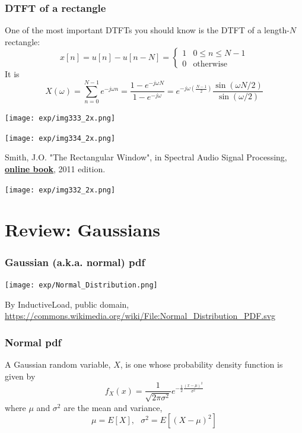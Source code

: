\documentclass{beamer}
\begin{document}
\begin{frame}
  \frametitle{DTFT of a rectangle}

  One of the most important DTFTs you should know is the DTFT of a
  length-$N$ rectangle:
  \[
  x[n] = u[n]-u[n-N]=\begin{cases}
  1 & 0\le n \le N-1\\
  0 & \mbox{otherwise}
  \end{cases}
  \]
  It is
  \[
  X(\omega)  = \sum_{n=0}^{N-1} e^{-j\omega n} =\frac{1-e^{-j\omega N}}{1-e^{-j\omega}}
  = e^{-j\omega\left(\frac{N-1}{2}\right)}\frac{\sin(\omega N/2)}{\sin(\omega/2)}
  \]
\end{frame}

\begin{frame}
  \centerline{\texttt{[image: exp/img333\_2x.png]}}
  \centerline{\texttt{[image: exp/img334\_2x.png]}}
  \begin{tiny}
    Smith, J.O. "The Rectangular Window", in 
    Spectral Audio Signal Processing,
    \href{http://ccrma.stanford.edu/~jos/sasp/Rectangular_Window.html}{\bf\color{blue}online book},
    2011 edition.
  \end{tiny}
\end{frame}

\begin{frame}
  \centerline{\texttt{[image: exp/img332\_2x.png]}}
\end{frame}


\section[Gaussians]{Review: Gaussians}
\setcounter{subsection}{1}

\begin{frame}
  \frametitle{Gaussian (a.k.a. normal) pdf}
  \centerline{\texttt{[image: exp/Normal\_Distribution.png]}}
  \begin{tiny}
    By InductiveLoad, public domain,
    \url{https://commons.wikimedia.org/wiki/File:Normal_Distribution_PDF.svg}
  \end{tiny}
\end{frame}

\begin{frame}
  \frametitle{Normal pdf}

  A Gaussian random variable, $X$, is one whose probability density
  function is given by
  \[
  f_X(x) = \frac{1}{\sqrt{2\pi\sigma^2}}e^{-\frac{1}{2}\frac{(x-\mu)^2}{\sigma^2}}
  \]
  where $\mu$ and $\sigma^2$ are the mean and variance,
  \[
  \mu=E\left[X\right],~~~
  \sigma^2 = E\left[(X-\mu)^2\right]
  \]
\end{frame}
\end{document}
